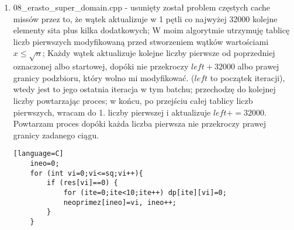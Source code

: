 \documentclass[12pt]{article}
\begin{document}
\begin {enumerate}
\begin{lstlisting}[style=mystyle, caption= Sito funkcyjne z dynamic schedulingiem][language=C]
		for (i=0;i<=sq;i++){
			if (res[i]==0){
				based_left=left-left%i+((left%i==0)?0:i);
				for (j=based_left;j<=right;j+=i) res[j]=1;
			}
		}
	}
	\end{lstlisting}
	Kod ten ma 3 zasadnicze różnice w porównaniu z kodem (3) w kontekście wspólbieżności:
	\begin{enumerate}
		\item Dyrektywa tworzy wątki, które podzielą się nieomal równomiernie pracą - ponieważ każdy wątek musi użyć każdej liczby pierwszej z części domkniętej sita do oznaczenia przedziału z części otwartej sita o wielkości (prawie) równej dla każdego wątku.
		\item False sharing zachodzi w szczególnym przypadku, gdy sprawdzam pod kątem pierwszości liczbę \(x\) - albo ją odnaczam jako złożoną, razem z nią ściągając do cache liczbę \(y\) w części otwartej używanej przez inny wątek, która może się zmieniać, ponieważ \(|x-y|<64\) (64 bajty to rozmiar linii pamięci, a rozmiar typu bool na systemie, na którym zaszło testowanie to 1 bajt). Może on jednak zajść nie więcej niż \((4+1)*64*log_2(n)\) razy, bo \(\sqrt[log_2(n)]{n}\le log_2(n)\), a liczba wątków to co najwyżej \(4\), dodatkowe \(+1\) wynika z wątku używającego podciągu obok tablicy z części domkniętej sita - jest to liczba o kilka rzędów wielkości mniejsza niż \(n\), zatem (co pokaże później VTune profiler) false sharing nie będzie prawie wcale wpływał na czas przetwarzania.
		\item Wątki będą modyfikowały współdzielone L2 i L3 cache - co za tym idzie, często będą zachodziły cache-missy, ponieważ L2 i L3 cache będą często zmieniały dane - w praktyce każdy wątek będzie modyfikował zupełnie inne części tablicy, które będą stale się zmieniać (inaczej niż np. w przypadku, w którym 1 wątek modyfikuje co 2. element tablicy), a nie zmieszczą się one w L1 cache (mogącej pomieścić 32KB danych).
	\end{enumerate}

	\item 08\_erasto\_super\_domain.cpp - usunięty został problem częstych cache missów przez to, że wątek aktualizuje w 1 pętli co najwyżej 32000 kolejne elementy sita plus kilka dodatkowych; W moim algorytmie utrzymuję tablicę liczb pierwszych modyfikowaną przed stworzeniem wątków wartościami \(x\le \sqrt{n}\); Każdy wątek aktualizuje kolejne liczby pierwsze od poprzedniej oznaczonej albo startowej, dopóki nie przekroczy \(left+32000\) albo prawej granicy podzbioru, który wolno mi modyfikować. (\(left\) to początek iteracji), wtedy jest to jego ostatnia iteracja w tym batchu; przechodzę do kolejnej liczby powtarzając proces; w końcu, po przejściu całej tablicy liczb pierwszych, wracam do 1. liczby pierwszej i aktualizuje \(left+=32000\). Powtarzam proces dopóki każda liczba pierwsza nie przekroczy prawej granicy zadanego ciągu.
	\begin{lstlisting}[style=mystyle, caption= Sito funkcyjne z dynamic schedulingiem][language=C]
	ineo=0;
	for (int vi=0;vi<=sq;vi++){
		if (res[vi]==0) {
			for (ite=0;ite<10;ite++) dp[ite][vi]=0;
			neoprimez[ineo]=vi, ineo++;
		}
	}
	

\end{lstlisting}
\end{enumerate}
\end{document}

